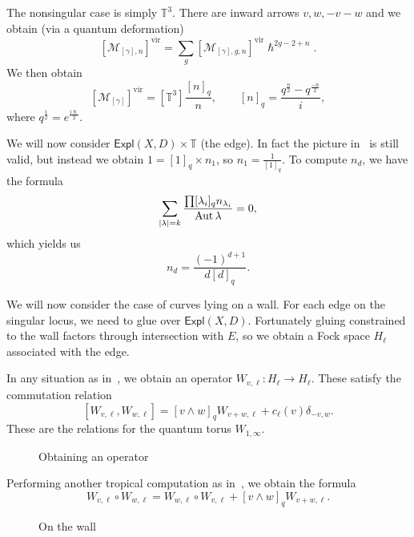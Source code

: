 \documentclass[leqno, openany]{memoir}
\theoremstyle{definition}
\theoremstyle{remark}
\theoremstyle{plain}
\theoremstyle{definition}
\theoremstyle{remark}
\newcommand{\mc}[1]{\mathcal{#1}}
\newcommand{\T}{\mathbb{T}}
\newcommand{\mr}[1]{\mathrm{#1}}
\newcommand{\ms}[1]{\mathsf{#1}}
\DeclareMathOperator{\Aut}{Aut}
\begin{document}
The nonsingular case is simply $\T^3$. There are inward arrows $v, w, -v-w$ and we obtain (via a quantum deformation)
\[ [\mc{M}_{[\gamma],n}]^{\mr{vir}} = \sum_g [\mc{M}_{[\gamma],g,n}]^{\mr{vir}} \hslash^{2g-2+n}. \]
We then obtain
\[ [\mc{M}_{[\gamma]}]^{\mr{vir}} = [\T^3] \frac{[n]_q}{n}, \qquad [n]_q = \frac{q^{\frac{n}{2}} - q^{\frac{-n}{2}}}{i}, \]
where $q^{\frac{1}{2}} = e^{\frac{i\hslash}{2}}$. 

We will now consider $\ms{Expl}(X, D) \times \T$ (the edge). In fact the picture in~ is still valid, but instead we obtain $1 = [1]_q \times n_1$, so $n_1 = \frac{1}{[1]_q}$. To compute $n_d$, we have the formula
\[ \sum_{\abs{\lambda} = k} \frac{\prod [ \lambda_i ]_q n_{\lambda_i}}{\Aut \lambda} = 0, \]
which yields us
\[ n_d = \frac{(-1)^{d+1}}{d[d]_q}. \]

We will now consider the case of curves lying on a wall. For each edge on the singular locus, we need to glue over $\ms{Expl}(X, D)$. Fortunately gluing constrained to the wall factors through intersection with $E$, so we obtain a Fock space $H_{\ell}$ associated with the edge.

In any situation as in~, we obtain an operator $W_{v, \ell} \colon H_{\ell} \to H_{\ell}$. These satisfy the commutation relation
\[ [ W_{v,\ell}, W_{w, \ell} ] = [v \wedge w]_{q} W_{v+w, \ell} + c_{\ell}(v) \delta_{-v,w}. \]
These are the relations for the quantum torus $W_{1,\infty}$.
\begin{figure}[h]
  \centering
  \caption{Obtaining an operator}
  \label{fig:operator}
\end{figure}

Performing another tropical computation as in~, we obtain the formula
\[ W_{v, \ell} \circ W_{w,\ell} = W_{w,\ell} \circ W_{v,\ell} + [v \wedge w]_q W_{v+w,\ell}. \]
\begin{figure}[h]
  \centering
  \caption{On the wall}
  \label{fig:wall}
\end{figure}
\end{document}
